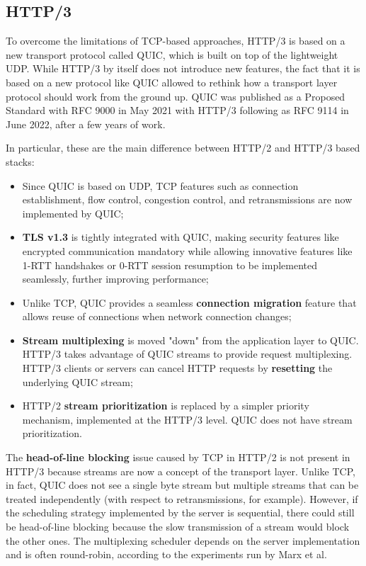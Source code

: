 \subsection{HTTP/3}
\label{sec:bg/http3}

To overcome the limitations of TCP-based approaches, HTTP/3 is based on a new transport protocol called QUIC, which is built on top of the lightweight UDP. While HTTP/3 by itself does not introduce new features, the fact that it is based on a new protocol like QUIC allowed to rethink how a transport layer protocol should work from the ground up. QUIC was published as a Proposed Standard with RFC 9000 in May 2021 with HTTP/3 following as RFC 9114 in June 2022, after a few years of work.\cite{http3}

In particular, these are the main difference between HTTP/2 and HTTP/3 based stacks:

\begin{itemize}
    \item Since QUIC is based on UDP, TCP features such as connection establishment, flow control, congestion control, and retransmissions are now implemented by QUIC;
    \item \textbf{TLS v1.3} is tightly integrated with QUIC, making security features like encrypted communication mandatory while allowing innovative features like 1-RTT handshakes or 0-RTT session resumption to be implemented seamlessly, further improving performance;
    \item Unlike TCP, QUIC provides a seamless \textbf{connection migration} feature that allows reuse of connections when network connection changes;
    \item \textbf{Stream multiplexing} is moved "down" from the application layer to QUIC. HTTP/3 takes advantage of QUIC streams to provide request multiplexing. HTTP/3 clients or servers can cancel HTTP requests by \textbf{resetting} the underlying QUIC stream;
    \item HTTP/2 \textbf{stream prioritization} is replaced by a simpler priority mechanism, implemented at the HTTP/3 level. QUIC does not have stream prioritization.
\end{itemize}


The \textbf{head-of-line blocking} issue caused by TCP in HTTP/2 is not present in HTTP/3 because streams are now a concept of the transport layer. Unlike TCP, in fact, QUIC does not see a single byte stream but multiple streams that can be treated independently (with respect to retransmissions, for example). However, if the scheduling strategy implemented by the server is sequential, there could still be head-of-line blocking because the slow transmission of a stream would block the other ones. The multiplexing scheduler depends on the server implementation and is often round-robin, according to the experiments run by Marx et al.\cite{quicdiversity}

